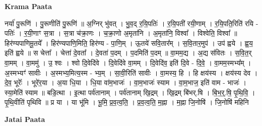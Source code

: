 \documentclass[17pt]{extarticle}
\begin{document}
\textbf{Krama Paata} \newline

नर्या॑ पु॒रूणि॑ । पु॒रूणीति॑ पु॒रूणि॑ ॥ अ॒ग्निर् भु॑वत् । भु॒व॒द् र॒यि॒पतिः॑ । र॒यि॒पती॑ रयी॒णाम् । र॒यि॒पति॒रिति॑ रयि - पतिः॑ । र॒यी॒णाꣳ स॒त्रा । स॒त्रा च॑क्रा॒णः । च॒क्रा॒णो अ॒मृता॑नि । अ॒मृता॑नि॒ विश्वा᳚ । विश्वेति॒ विश्वा᳚ ॥ हिर॑ण्यपाणिमू॒तये᳚ । हिर॑ण्यपाणि॒मिति॒ हिर॑ण्य - पा॒णि॒म् । ऊ॒तये॑ सवि॒तार᳚म् । स॒वि॒तार॒मुप॑ । उप॑ ह्वये । ह्व॒य॒ इति॑ ह्वये ॥ स चेत्ता᳚ । चेत्ता॑ दे॒वता᳚ । दे॒वता॑ प॒दम् । प॒दमिति॑ प॒दम् ॥ वा॒मम॒द्य । अ॒द्य स॑वितः । स॒वि॒त॒र् वा॒मम् । वा॒ममु॑ । उ॒ श्वः । श्वो दि॒वेदि॑वे । दि॒वेदि॑वे वा॒मम् । दि॒वेदि॑व॒ इति॑ दि॒वे - दि॒वे॒ । वा॒मम॒स्मभ्य᳚म् । अ॒स्मभ्यꣳ॑ सावीः । अ॒स्मभ्य॒मित्य॒स्म - भ्य॒म् । सा॒वी॒रिति॑ सावीः । वा॒मस्य॒ हि । हि क्षय॑स्य । क्षय॑स्य देव । दे॒व॒ भूरेः᳚ । भूरे॑र॒या । अ॒या धि॒या । धि॒या वा॑म॒भाजः॑ । वा॒म॒भाजः॑ स्याम । वा॒म॒भाज॒ इति॑ वाम - भाजः॑ । स्या॒मेति॑ स्याम ॥ बडि॒त्था । इ॒त्था पर्व॑तानाम् । पर्व॑तानाम् खि॒द्रम् । खि॒द्रम् बि॑भर्.षि । बि॒भ॒र्॒.षि॒ पृ॒थि॒वि॒ । पृ॒थि॒वीति॑ पृथिवि ॥ प्र या । या भू॑मि । भू॒मि॒ प्र॒व॒त्व॒ति॒ । प्र॒व॒त्व॒ति॒ म॒ह्ना । म॒ह्ना जि॒नोषि॑ । जि॒नोषि॑ महिनि \newline

\textbf{Jatai Paata} \newline
\end{document}
